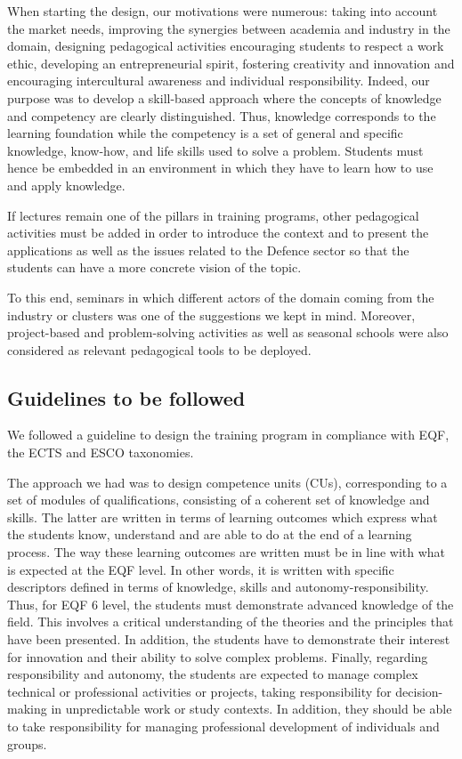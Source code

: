 \documentclass[conference]{IEEEtran}
\begin{document}
\noindent When starting the design, our motivations were numerous: taking into account the market needs, improving the synergies between academia and industry in the domain, designing pedagogical activities encouraging students to respect a work ethic, developing an entrepreneurial spirit, fostering creativity and innovation and encouraging intercultural awareness and individual responsibility. 
Indeed, our purpose was to develop a skill-based approach where the concepts of knowledge and competency are clearly distinguished. Thus, knowledge corresponds to the learning foundation while the competency is a set of general and specific knowledge, know-how, and life skills used to solve a problem. Students must hence be embedded in an environment in which they have to learn how to use and apply knowledge.

\noindent If lectures remain one of the pillars in training programs, other pedagogical activities must be added in order to introduce the context and to present the applications as well as the issues related to the Defence sector so that the students can have a more concrete vision of the topic.

\noindent To this end, seminars in which different actors of the domain coming from the industry or clusters was one of the suggestions we kept in mind. Moreover, project-based and problem-solving activities as well as seasonal schools were also considered as relevant pedagogical tools to be deployed.  
\subsection{Guidelines to be followed}
We followed a guideline to design the training program in compliance with EQF, the ECTS and ESCO taxonomies.

\noindent The approach we had was to design competence units (CUs), corresponding to a set of modules of qualifications, consisting of a coherent set of knowledge and skills. The latter are written in terms of learning outcomes which express what the students know, understand and are able to do at the end of a learning process. The way these learning outcomes are written must be in line with what is expected at the EQF level. In other words, it is written with specific descriptors defined in terms of knowledge, skills and autonomy-responsibility. Thus, for EQF 6 level, the students must demonstrate advanced knowledge of the field. This involves a critical understanding of the theories and the principles that have been presented. In addition, the students have to demonstrate their interest for innovation and their ability to solve complex problems. Finally, regarding responsibility and autonomy, the students are expected to manage complex technical or professional activities or projects, taking responsibility for decision-making in unpredictable work or study contexts. In addition, they should be able to take responsibility for managing professional development of individuals and groups. 
\end{document}
